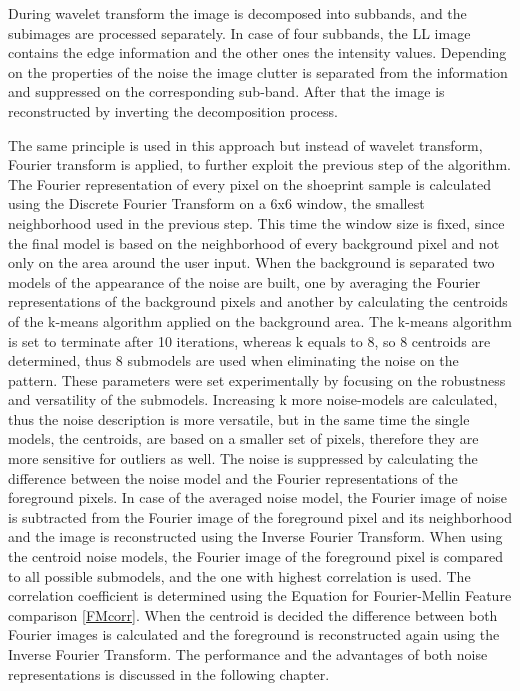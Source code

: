 \documentclass[draft,final]{vutinfth} %
\begin{document}
During wavelet transform the image is decomposed into subbands, and the subimages are processed separately.
In case of four subbands, the LL image contains the edge information and the other ones the intensity values.
Depending on the properties of the noise the image clutter is separated from the information and suppressed on the corresponding sub-band.
After that the image is reconstructed by inverting the decomposition process.
\par
The same principle is used in this approach but instead of wavelet transform, Fourier transform is applied, to further exploit the previous step of the algorithm.
The Fourier representation of every pixel on the shoeprint sample is calculated using the Discrete Fourier Transform on a 6x6 window, the smallest neighborhood used in the previous step.
This time the window size is fixed, since the final model is based on the neighborhood of every background pixel and not only on the area around the user input.
When the background is separated two models of the appearance of the noise are built, one by averaging the Fourier representations of the background pixels and another by calculating the centroids of the k-means algorithm applied on the background area.
The k-means algorithm is set to terminate after 10 iterations, whereas k equals to 8, so 8 centroids are determined, thus 8 submodels are used when eliminating the noise on the pattern.
These parameters were set experimentally by focusing on the robustness and versatility of the submodels.
Increasing k more noise-models are calculated, thus the noise description is more versatile, but in the same time the single models, the centroids, are based on a smaller set of pixels, therefore they are more sensitive for outliers as well. 
The noise is suppressed by calculating the difference between the noise model and the Fourier representations of the foreground pixels.
In case of the averaged noise model, the Fourier image of noise is subtracted from the Fourier image of the foreground pixel and its neighborhood and the image is reconstructed using the Inverse Fourier Transform.
When using the centroid noise models, the Fourier image of the foreground pixel is compared to all possible submodels, and the one with highest correlation is used.
The correlation coefficient is determined using the Equation for Fourier-Mellin Feature comparison \ref{FMcorr}.
When the centroid is decided the difference between both Fourier images is calculated and the foreground is reconstructed again using the Inverse Fourier Transform.
The performance and the advantages of both noise representations is discussed in the following chapter.
\end{document}
